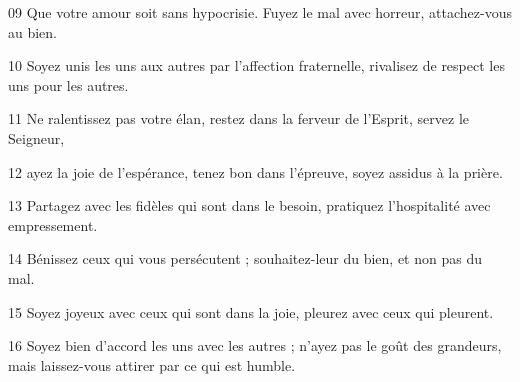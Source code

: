 
09 Que votre amour soit sans hypocrisie. Fuyez le mal avec horreur, attachez-vous au bien.

10 Soyez unis les uns aux autres par l’affection fraternelle, rivalisez de respect les uns pour les autres.

11 Ne ralentissez pas votre élan, restez dans la ferveur de l’Esprit, servez le Seigneur,

12 ayez la joie de l’espérance, tenez bon dans l’épreuve, soyez assidus à la prière.

13 Partagez avec les fidèles qui sont dans le besoin, pratiquez l’hospitalité avec empressement.

14 Bénissez ceux qui vous persécutent ; souhaitez-leur du bien, et non pas du mal.

15 Soyez joyeux avec ceux qui sont dans la joie, pleurez avec ceux qui pleurent.

16 Soyez bien d’accord les uns avec les autres ; n’ayez pas le goût des grandeurs, mais laissez-vous attirer par ce qui est humble.